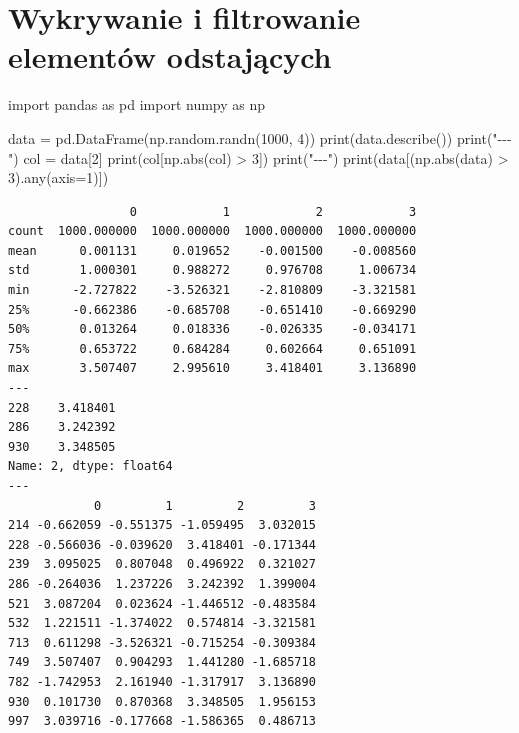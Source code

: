 \documentclass[
  polish,
  letterpaper,
  DIV=11,
  numbers=noendperiod]{scrreprt}
\newenvironment{Shaded}{\begin{snugshade}}{\end{snugshade}}
\newcommand{\BuiltInTok}[1]{\textcolor[rgb]{0.00,0.23,0.31}{#1}}
\newcommand{\DecValTok}[1]{\textcolor[rgb]{0.68,0.00,0.00}{#1}}
\newcommand{\ImportTok}[1]{\textcolor[rgb]{0.00,0.46,0.62}{#1}}
\newcommand{\NormalTok}[1]{\textcolor[rgb]{0.00,0.23,0.31}{#1}}
\newcommand{\OperatorTok}[1]{\textcolor[rgb]{0.37,0.37,0.37}{#1}}
\newcommand{\StringTok}[1]{\textcolor[rgb]{0.13,0.47,0.30}{#1}}
\begin{document}
\section{Wykrywanie i filtrowanie elementów
odstających}\label{wykrywanie-i-filtrowanie-elementuxf3w-odstajux105cych}

\begin{Shaded}
\begin{Highlighting}[]
\ImportTok{import}\NormalTok{ pandas }\ImportTok{as}\NormalTok{ pd}
\ImportTok{import}\NormalTok{ numpy }\ImportTok{as}\NormalTok{ np}

\NormalTok{data }\OperatorTok{=}\NormalTok{ pd.DataFrame(np.random.randn(}\DecValTok{1000}\NormalTok{, }\DecValTok{4}\NormalTok{))}
\BuiltInTok{print}\NormalTok{(data.describe())}
\BuiltInTok{print}\NormalTok{(}\StringTok{"{-}{-}{-}"}\NormalTok{)}
\NormalTok{col }\OperatorTok{=}\NormalTok{ data[}\DecValTok{2}\NormalTok{]}
\BuiltInTok{print}\NormalTok{(col[np.}\BuiltInTok{abs}\NormalTok{(col) }\OperatorTok{\textgreater{}} \DecValTok{3}\NormalTok{])}
\BuiltInTok{print}\NormalTok{(}\StringTok{"{-}{-}{-}"}\NormalTok{)}
\BuiltInTok{print}\NormalTok{(data[(np.}\BuiltInTok{abs}\NormalTok{(data) }\OperatorTok{\textgreater{}} \DecValTok{3}\NormalTok{).}\BuiltInTok{any}\NormalTok{(axis}\OperatorTok{=}\DecValTok{1}\NormalTok{)])}
\end{Highlighting}
\end{Shaded}

\begin{verbatim}
                 0            1            2            3
count  1000.000000  1000.000000  1000.000000  1000.000000
mean      0.001131     0.019652    -0.001500    -0.008560
std       1.000301     0.988272     0.976708     1.006734
min      -2.727822    -3.526321    -2.810809    -3.321581
25%      -0.662386    -0.685708    -0.651410    -0.669290
50%       0.013264     0.018336    -0.026335    -0.034171
75%       0.653722     0.684284     0.602664     0.651091
max       3.507407     2.995610     3.418401     3.136890
---
228    3.418401
286    3.242392
930    3.348505
Name: 2, dtype: float64
---
            0         1         2         3
214 -0.662059 -0.551375 -1.059495  3.032015
228 -0.566036 -0.039620  3.418401 -0.171344
239  3.095025  0.807048  0.496922  0.321027
286 -0.264036  1.237226  3.242392  1.399004
521  3.087204  0.023624 -1.446512 -0.483584
532  1.221511 -1.374022  0.574814 -3.321581
713  0.611298 -3.526321 -0.715254 -0.309384
749  3.507407  0.904293  1.441280 -1.685718
782 -1.742953  2.161940 -1.317917  3.136890
930  0.101730  0.870368  3.348505  1.956153
997  3.039716 -0.177668 -1.586365  0.486713
\end{verbatim}
\end{document}
